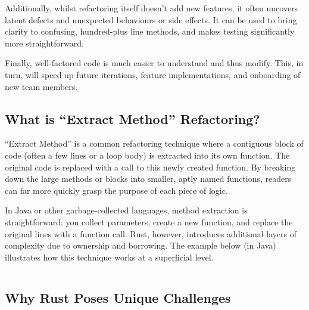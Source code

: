 Additionally, whilst refactoring itself doesn’t add new features, it often
uncovers latent defects and unexpected behaviours or side effects. It can be
used to bring clarity to confusing, hundred-plus line methods, and makes testing
significantly more straightforward.

Finally, well-factored code is much easier to understand and thus modify. This,
in turn, will speed up future iterations, feature implementations, and
onboarding of new team members.

\subsection{What is “Extract Method” Refactoring?}
\label{sec:extract-method}

“Extract Method” is a common refactoring technique where a contiguous block of
code (often a few lines or a loop body) is extracted into its own function. The
original code is replaced with a call to this newly created function. By
breaking down the large methods or blocks into smaller, aptly named functions,
readers can far more quickly grasp the purpose of each piece of logic.

In Java or other garbage-collected languages, method extraction is
straightforward: you collect parameters, create a new function, and replace the
original lines with a function call. Rust, however, introduces additional layers
of complexity due to ownership and borrowing. The example below (in Java)
illustrates how this technique works at a superficial level.

\inputminted{java}{Code/refactor_example.java}

\subsection{Why Rust Poses Unique Challenges}
\label{sec:rust-challenges}

